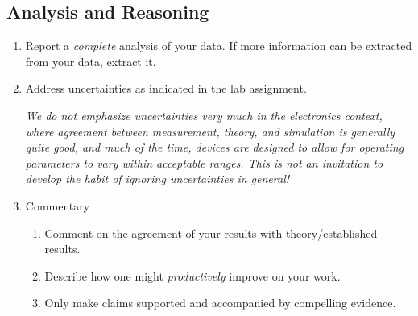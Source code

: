 \documentclass[11 pt]{article}
\begin{document}
\subsection*{Analysis and Reasoning}
\begin{enumerate}
\item Report a \textit{complete} analysis of your data. If more
  information can be extracted from your data, extract it.

\item Address uncertainties as indicated in the lab
  assignment.

  \emph{We do not emphasize uncertainties very much in the
    electronics context, where agreement between measurement,
    theory, and simulation is generally quite good, and much of the
    time, devices are designed to allow for operating parameters to
    vary within acceptable ranges. This is not an invitation to
    develop the habit of ignoring uncertainties in general!}

\item Commentary
  \begin{enumerate}
  \item Comment on the agreement of your results with
    theory/established results.

  \item Describe how one might \textit{productively} improve on your work.

  \item Only make claims supported and accompanied by compelling evidence.

  \end{enumerate}

\end{enumerate}
\end{document}
